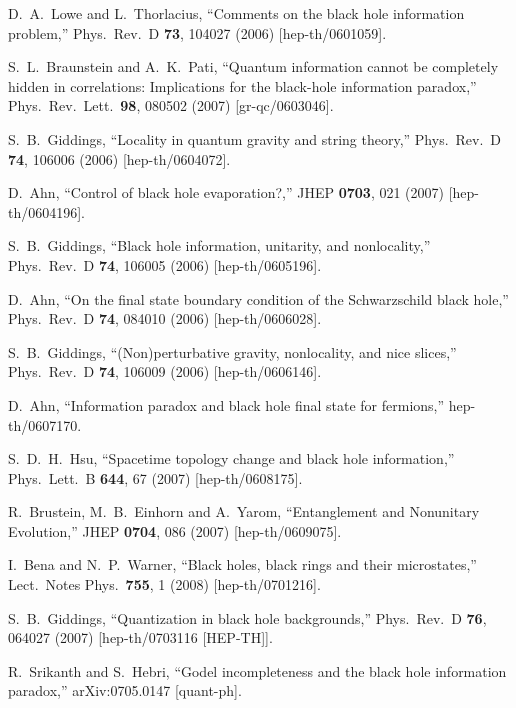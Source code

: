 \documentclass[12pt]{article}
\begin{document}
\begin{thebibliography}{99}
  D.~A.~Lowe and L.~Thorlacius,
  ``Comments on the black hole information problem,''
  Phys.\ Rev.\ D {\bf 73}, 104027 (2006)
  [hep-th/0601059].

  S.~L.~Braunstein and A.~K.~Pati,
  ``Quantum information cannot be completely hidden in correlations: Implications for the black-hole information paradox,''
  Phys.\ Rev.\ Lett.\  {\bf 98}, 080502 (2007)
  [gr-qc/0603046].

  S.~B.~Giddings,
  ``Locality in quantum gravity and string theory,''
  Phys.\ Rev.\ D {\bf 74}, 106006 (2006)
  [hep-th/0604072].

  D.~Ahn,
  ``Control of black hole evaporation?,''
  JHEP {\bf 0703}, 021 (2007)
  [hep-th/0604196].

  S.~B.~Giddings,
  ``Black hole information, unitarity, and nonlocality,''
  Phys.\ Rev.\ D {\bf 74}, 106005 (2006)
  [hep-th/0605196].

  D.~Ahn,
  ``On the final state boundary condition of the Schwarzschild black hole,''
  Phys.\ Rev.\ D {\bf 74}, 084010 (2006)
  [hep-th/0606028].

  S.~B.~Giddings,
  ``(Non)perturbative gravity, nonlocality, and nice slices,''
  Phys.\ Rev.\ D {\bf 74}, 106009 (2006)
  [hep-th/0606146].

  D.~Ahn,
  ``Information paradox and black hole final state for fermions,''
  hep-th/0607170.

  S.~D.~H.~Hsu,
  ``Spacetime topology change and black hole information,''
  Phys.\ Lett.\ B {\bf 644}, 67 (2007)
  [hep-th/0608175].

  R.~Brustein, M.~B.~Einhorn and A.~Yarom,
  ``Entanglement and Nonunitary Evolution,''
  JHEP {\bf 0704}, 086 (2007)
  [hep-th/0609075].

  I.~Bena and N.~P.~Warner,
  ``Black holes, black rings and their microstates,''
  Lect.\ Notes Phys.\  {\bf 755}, 1 (2008)
  [hep-th/0701216].

  S.~B.~Giddings,
  ``Quantization in black hole backgrounds,''
  Phys.\ Rev.\ D {\bf 76}, 064027 (2007)
  [hep-th/0703116 [HEP-TH]].

  R.~Srikanth and S.~Hebri,
  ``Godel incompleteness and the black hole information paradox,''
  arXiv:0705.0147 [quant-ph].


\end{thebibliography}
\end{document}
